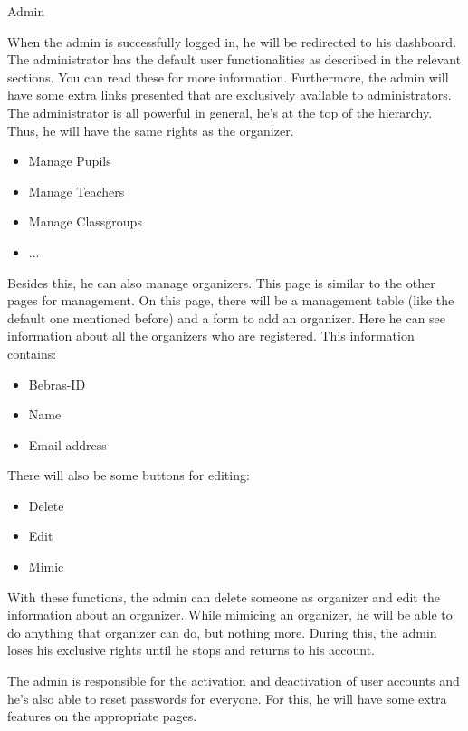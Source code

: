 \begin{section}{Admin}

When the admin is successfully logged in, he will be redirected to his dashboard. The administrator has the default user functionalities as described in the relevant sections. You can read these for more information. Furthermore, the admin will have some extra links presented that are exclusively available to administrators. 
\\

The administrator is all powerful in general, he's at the top of the hierarchy. Thus, he will have the same rights as the organizer.
\begin{itemize}
\item Manage Pupils
\item Manage Teachers
\item Manage Classgroups
\item ...
\end{itemize}

Besides this, he can also manage organizers. This page is similar to the other pages for management. On this page, there will be a management table (like the default one mentioned before) and a form to add an organizer. Here he can see information about all the organizers who are registered. This information contains:
\begin{itemize}
\item Bebras-ID
\item Name
\item Email address
\end{itemize}

There will also be some buttons for editing:
\begin{itemize}
\item Delete
\item Edit
\item Mimic
\end{itemize}

With these functions, the admin can delete someone as organizer and edit the information about an organizer. While mimicing an organizer, he will be able to do anything that organizer can do, but nothing more. During this, the admin loses his exclusive rights until he stops and returns to his account.

The admin is responsible for the activation and deactivation of user accounts and he's also able to reset passwords for everyone. For this, he will have some extra features on the appropriate pages.

\end{section}
